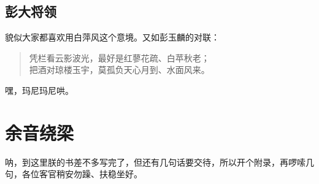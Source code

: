 \documentclass[]{ctexbook}
\theoremstyle{definition}
\theoremstyle{definition}
\theoremstyle{definition}
\theoremstyle{remark}
\begin{document}
\section{彭大将领}

貌似大家都喜欢用白萍风这个意境。又如彭玉麟的对联：

\begin{quote}
凭栏看云影波光，最好是红蓼花疏、白苹秋老；\\
把酒对琼楼玉宇，莫孤负天心月到、水面风来。
\end{quote}

嘿，玛尼玛尼哄。

\cleardoublepage

\hypertarget{appendix-}{%
\appendix {}}


\hypertarget{sound}{%
\chapter{余音绕梁}\label{sound}}

呐，到这里朕的书差不多写完了，但还有几句话要交待，所以开个附录，再啰嗦几句，各位客官稍安勿躁、扶稳坐好。



\backmatter
\printindex
\end{document}
